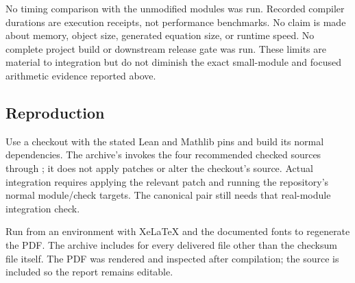 No timing comparison with the unmodified modules was run. Recorded compiler durations are execution receipts, not performance benchmarks. No claim is made about memory, object size, generated equation size, or runtime speed. No complete project build or downstream release gate was run. These limits are material to integration but do not diminish the exact small-module and focused arithmetic evidence reported above.

\subsection{Reproduction}
Use a checkout with the stated Lean and Mathlib pins and build its normal dependencies. The archive's  invokes the four recommended checked sources through ; it does not apply patches or alter the checkout's source. Actual integration requires applying the relevant patch and running the repository's normal module/check targets. The canonical pair still needs that real-module integration check.

Run  from an environment with XeLaTeX and the documented fonts to regenerate the PDF. The archive includes  for every delivered file other than the checksum file itself. The PDF was rendered and inspected after compilation; the source is included so the report remains editable.
